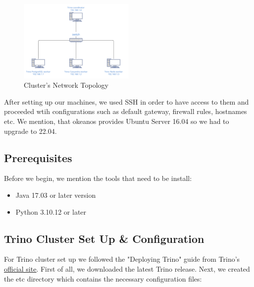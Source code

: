 \documentclass[conference]{IEEEtran}
\begin{document}
\begin{figure}[h]
    \centering
    \includegraphics[width=0.5\textwidth]{images/LAN.png}
    \caption{Cluster's Network Topology}
    \label{fig:LAN}
\end{figure}

After setting up our machines, we used SSH in order to have access to them and proceeded wtih configurations 
such as default gateway, firewall rules, hostnames etc. We mention, that okeanos provides Ubuntu Server 16.04 so
we had to upgrade to 22.04. 

\subsection{Prerequisites}

Before we begin, we mention the tools that need to be install:

\begin{itemize}
    \item {Java 17.03 or later version}
    \item {Python 3.10.12 or later}
\end{itemize}

\subsection{Trino Cluster Set Up \& Configuration}

For Trino cluster set up we followed the "Deploying Trino" guide from Trino's \textcolor{linkblue}{\underline{\href{https://trino.io/docs/current/installation/deployment.html}{official site}}}.
First of all, we downloaded the latest Trino release. Next, we created the etc directory which contains the necessary configuration files:
\end{document}
